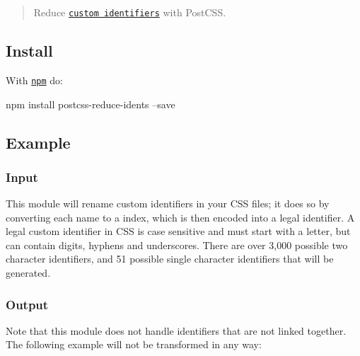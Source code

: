 \begin{quote}
Reduce \href{https://developer.mozilla.org/en-US/docs/Web/CSS/custom-ident}{\tt custom identifiers} with Post\+C\+SS. \end{quote}


\subsection*{Install}

With \href{https://npmjs.org/package/postcss-reduce-idents}{\tt npm} do\+:


\begin{DoxyCode}
npm install postcss-reduce-idents --save
\end{DoxyCode}


\subsection*{Example}

\subsubsection*{Input}

This module will rename custom identifiers in your C\+SS files; it does so by converting each name to a index, which is then encoded into a legal identifier. A legal custom identifier in C\+SS is case sensitive and must start with a letter, but can contain digits, hyphens and underscores. There are over 3,000 possible two character identifiers, and 51 possible single character identifiers that will be generated.




\subsubsection*{Output}




Note that this module does not handle identifiers that are not linked together. The following example will not be transformed in any way\+:


